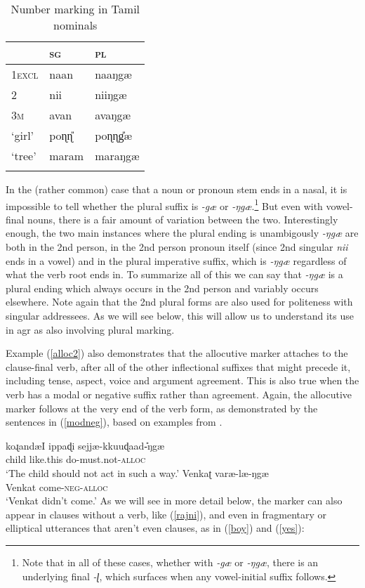\documentclass[output=paper, modfonts, nonflat]{langsci/langscibook}
\begin{document}
\begin{table}
  \caption{Number marking in Tamil nominals\label{tab:plnom}}
  \begin{tabular}{lll} 
    \lsptoprule
    & \textsc{sg} & \textsc{pl}\\ 
    \midrule
    1\textsc{excl} & naan & naaŋgæ\\
    2 & nii & niiŋgæ\\
    3\textsc{m} & avan & avaŋgæ\\
    `girl' & poɳɳ\U & poɳɳ\U gæ\\
    `tree' & maram & maraŋgæ\\
    \lspbottomrule
  \end{tabular}
\end{table}
In the (rather common) case that a noun or pronoun stem ends in a
nasal, it is impossible to tell whether the plural suffix is
\textit{-gæ} or \textit{-ŋgæ}.\footnote{Note that in all of these
  cases, whether with \textit{-gæ} or \textit{-ŋgæ}, there is an
  underlying final \textit{-ɭ}, which surfaces when any vowel-initial
  suffix follows.} But even with vowel-final nouns, there is a fair
amount of variation between the two. Interestingly enough, the two
main instances where the plural ending is unambigously \textit{-ŋgæ}
are both in the 2nd person, in the 2nd person pronoun itself (since
2nd singular \textit{nii} ends in a vowel) and in the plural
imperative suffix, which is \textit{-ŋgæ} regardless of what the verb
root ends in. To summarize all of this we can say that \textit{-ŋgæ}
is a plural ending which always occurs in the 2nd person and variably
occurs elsewhere. Note again that the 2nd plural forms are also used
for politeness with singular addressees. As we will see below, this
will allow us to understand its use in agr{} as also involving
plural marking. 

Example (\ref{alloc2}) also demonstrates that the allocutive marker
attaches to the clause-final verb, after all of the other inflectional
suffixes that might precede it, including tense, aspect, voice and
argument agreement. This is also true when the verb has a modal or
negative suffix rather than agreement. Again, the allocutive marker
follows at the very end of the verb form, as demonstrated by the
sentences in (\ref{modneg}), based on examples from
\citet{amrit:1991}.

\ea\label{modneg}
 \ea\label{modal}\gll koɻandæI{} ippaɖi sejjæ-kkuuɖaad\U-ŋgæ\\ 
 child {like.this} do-{must.not}-\textsc{alloc}\\
 \glt `The child should not act in such a way.'
 \ex\label{neg}\gll Venkaʈ varæ-læ-ŋgæ\\
 Venkat come-\textsc{neg}-\textsc{alloc}\\
 \glt `Venkat didn't come.'
 \z
\z
%
As we will see in more detail below, the marker can also appear in
clauses without a verb, like (\ref{rajni}), and even in fragmentary or
elliptical utterances that aren't even clauses, as in (\ref{boy}) and
(\ref{yes}):
\end{document}
